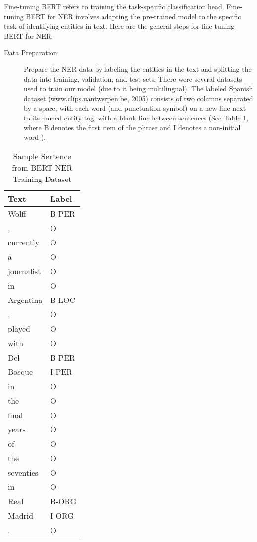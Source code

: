 Fine-tuning BERT refers to training the task-specific classification head. Fine-tuning BERT for NER involves adapting the pre-trained model to the specific task of identifying entities in text. Here are the general steps for fine-tuning BERT for NER:

\begin{description}
   \item[Data Preparation:] Prepare the NER data by labeling the entities in the text and splitting the data into training, validation, and test sets. There were several datasets used to train our model (due to it being multilingual). The labeled Spanish dataset (www.clips.uantwerpen.be, 2005) consists of two columns separated by a space, with each word (and punctuation symbol) on a new line next to its named entity tag, with a blank line between sentences (See Table \ref{tab:ner-dataset}, where B denotes the first item of the phrase and I denotes a non-initial word ).
\end{description}

\begin{table}[h]
\centering
    \begin{tabular}{ll}
    \hline
    \textbf{Text} & \textbf{Label} \\ \hline
    Wolff & B-PER \\
    , & O \\
    currently & O \\
    a & O \\
    journalist & O \\
    in & O \\
    Argentina & B-LOC \\
    , & O \\
    played & O \\
    with & O \\
    Del & B-PER \\
    Bosque & I-PER \\
    in & O \\
    the & O \\
    final & O \\
    years & O \\
    of & O \\
    the & O \\
    seventies & O \\
    in & O \\
    Real & B-ORG \\
    Madrid & I-ORG \\
    . & O \\ \hline
    \end{tabular}
\caption{Sample Sentence from BERT NER Training Dataset \cite{noauthor_language-independent_2005}}
\label{tab:ner-dataset}
\end{table}

